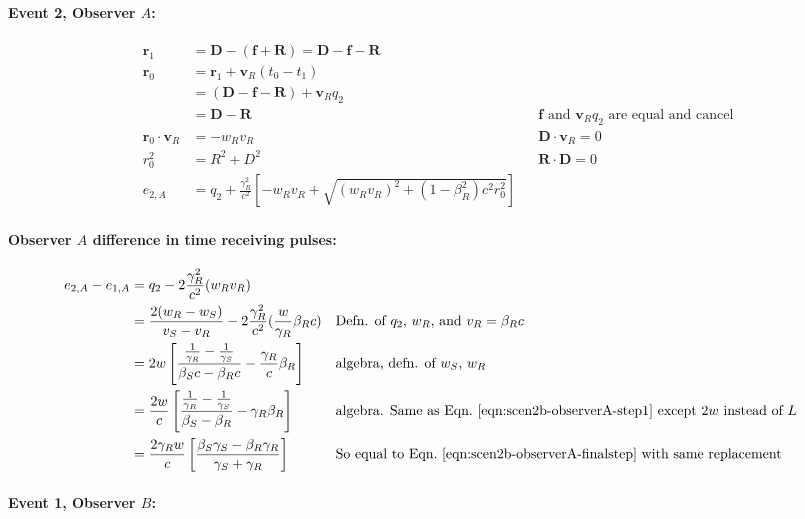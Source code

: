 \documentclass[a4paper]{article}
\theoremstyle{plain}
\theoremstyle{definition}
\newcommand{\vect}[1]{\mathbf{#1}}
\begin{document}
\paragraph{Event 2, Observer $A$:}

\begin{align*}
\vect{r}_1 & = \vect{D} - (\vect{f}+\vect{R}) = \vect{D} - \vect{f} - \vect{R} \\
\vect{r}_0
  & = \vect{r}_1 + \vect{v}_R (t_0 - t_1) \\
  & = (\vect{D} - \vect{f} - \vect{R}) + \vect{v}_R q_2 \\
  & = \vect{D} - \vect{R} & & \text{$\vect{f}$ and $\vect{v}_R q_2$ are equal and cancel} \\
\vect{r}_0 \cdot \vect{v}_R & = -w_Rv_R & & \text{$\vect{D} \cdot \vect{v}_R = 0$} \\
r_0^2 & = R^2 + D^2 & & \text{$\vect{R} \cdot \vect{D} = 0$} \\
e_{2,A} & = q_2 + \frac{\gamma_R^2}{c^2} \left[ -w_Rv_R + \sqrt{ (w_Rv_R)^2 + (1-\beta_R^2)c^2r_0^2 } \right]
\end{align*}


\paragraph{Observer $A$ difference in time receiving pulses:}

\begin{align*}
e_{2,A} - e_{1,A}
  & = q_2 - 2\frac{\gamma_R^2}{c^2} (w_R v_R) \\
  & = \frac{2(w_R-w_S)}{v_S - v_R} - 2\frac{\gamma_R^2}{c^2} ( \frac{w}{\gamma_R} \beta_R c ) & & \text{Defn. of $q_2$, $w_R$, and $v_R = \beta_R c$} \\
  & = 2w \left[ \frac{\frac{1}{\gamma_R} - \frac{1}{\gamma_S}}{\beta_S c - \beta_R c} - \frac{\gamma_R}{c} \beta_R \right] & & \text{algebra, defn. of $w_S$, $w_R$} \\
  & = \frac{2w}{c} \left[ \frac{\frac{1}{\gamma_R} - \frac{1}{\gamma_S}}{\beta_S-\beta_R} - \gamma_R \beta_R \right] & & \text{algebra. Same as Eqn.~\eqref{eqn:scen2b-observerA-step1} except $2w$ instead of $L$} \\
  & = \frac{2\gamma_R w}{c} \left[ \frac{\beta_S\gamma_S - \beta_R\gamma_R}{\gamma_S + \gamma_R} \right] & & \text{So equal to Eqn.~\eqref{eqn:scen2b-observerA-finalstep} with same replacement}
\end{align*}


\paragraph{Event 1, Observer $B$:}
\end{document}
